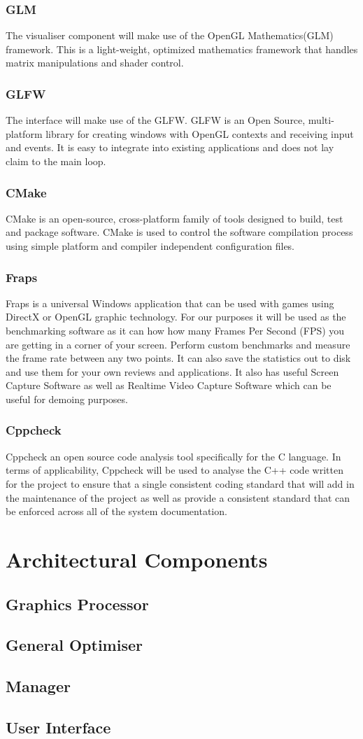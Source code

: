 \documentclass[11pt]{article}
\begin{document}
\subsubsection{GLM}
The visualiser component will make use of the OpenGL Mathematics(GLM) framework. This is a light-weight, optimized mathematics framework that handles matrix manipulations and shader control.
\subsubsection{GLFW}
The interface will make use of the GLFW. GLFW is an Open Source, multi-platform library for creating windows with OpenGL contexts and receiving input and events. It is easy to integrate into existing applications and does not lay claim to the main loop.
\subsubsection{CMake}
CMake is an open-source, cross-platform family of tools designed to build, test and package software. CMake is used to control the software compilation process using simple platform and compiler independent configuration files.
\subsubsection{Fraps}
Fraps is a universal Windows application that can be used with games using DirectX or OpenGL graphic technology. For our purposes it will be used as the benchmarking software as it can how how many Frames Per Second (FPS) you are getting in a corner of your screen.  Perform custom benchmarks and measure the frame rate between any two points. It can also save the statistics out to disk and use them for your own reviews and applications. It also has useful Screen Capture Software as well as Realtime Video Capture Software which can be useful for demoing purposes.
\subsubsection{Cppcheck}
Cppcheck an open source code analysis tool specifically for the C language. In terms of applicability, Cppcheck will be used to analyse the C++ code written for the project to ensure that a single consistent coding standard that will add in the maintenance of the project as well as provide a consistent standard that can be enforced across all of the system documentation.

\section{Architectural Components}
\subsection{Graphics Processor}
\subsection{General Optimiser}
\subsection{Manager}
\subsection{User Interface}
\end{document}
